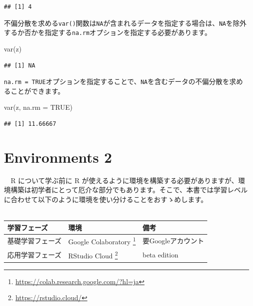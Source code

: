 \documentclass[
  12pt,
]{book}
\newenvironment{Shaded}{\begin{snugshade}}{\end{snugshade}}
\newcommand{\AttributeTok}[1]{\textcolor[rgb]{0.77,0.63,0.00}{#1}}
\newcommand{\ConstantTok}[1]{\textcolor[rgb]{0.00,0.00,0.00}{#1}}
\newcommand{\FunctionTok}[1]{\textcolor[rgb]{0.00,0.00,0.00}{#1}}
\newcommand{\NormalTok}[1]{#1}
\DeclareRobustCommand{\href}[2]{#2\footnote{\url{#1}}}
\begin{document}
\begin{verbatim}
## [1] 4
\end{verbatim}

不偏分散を求める\texttt{var()}関数は\texttt{NA}が含まれるデータを指定する場合は、\texttt{NA}を除外するか否かを指定する\texttt{na.rm}オプションを指定する必要があります。

\begin{Shaded}
\begin{Highlighting}[]
\FunctionTok{var}\NormalTok{(z)}
\end{Highlighting}
\end{Shaded}

\begin{verbatim}
## [1] NA
\end{verbatim}

\texttt{na.rm\ =\ TRUE}オプションを指定することで、\texttt{NA}を含むデータの不偏分散を求めることができます。

\begin{Shaded}
\begin{Highlighting}[]
\FunctionTok{var}\NormalTok{(z, }\AttributeTok{na.rm =} \ConstantTok{TRUE}\NormalTok{)}
\end{Highlighting}
\end{Shaded}

\begin{verbatim}
## [1] 11.66667
\end{verbatim}

\hypertarget{environments-2}{%
\chapter{Environments 2}\label{environments-2}}

　R について学ぶ前に R が使えるように環境を構築する必要がありますが、環境構築は初学者にとって厄介な部分でもあります。そこで、本書では学習レベルに合わせて以下のように環境を使い分けることをおすゝめします。\\
　

\begin{longtable}[]{@{}lll@{}}
\toprule
学習フェーズ & 環境 & 備考 \\
\midrule
\endhead
基礎学習フェーズ & \href{https://colab.research.google.com/?hl=ja}{Google Colaboratory } & 要Googleアカウント \\
応用学習フェーズ & \href{https://rstudio.cloud/}{RStudio Cloud } & beta edition \\
\bottomrule
\end{longtable}
\end{document}
